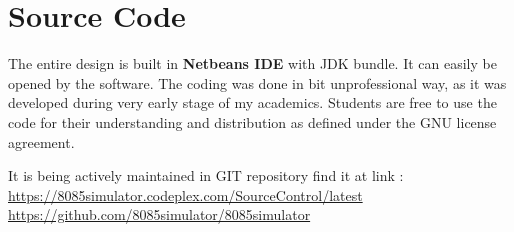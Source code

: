\section{Source Code}
The entire design is built in \textbf{Netbeans IDE} with JDK bundle. It can easily be opened by the software. The coding was done in bit unprofessional way, as it was developed during very early stage of my academics. Students are free to use the code for their understanding and distribution as defined under the GNU license agreement. 


It is being actively maintained in GIT repository find it at link :\\
\url{https://8085simulator.codeplex.com/SourceControl/latest}\\
\url{https://github.com/8085simulator/8085simulator}
